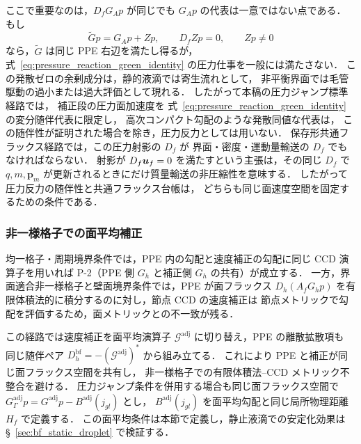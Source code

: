 ここで重要なのは，$D_fG_Ap$ が同じでも $G_Ap$ の代表は一意ではない点である．
もし
\[
  \widetilde Gp = G_Ap+Zp,\qquad D_fZp=0,\qquad Zp\ne0
\]
なら，$\widetilde G$ は同じ PPE 右辺を満たし得るが，
式~\eqref{eq:pressure_reaction_green_identity} の圧力仕事を一般には満たさない．
この発散ゼロの余剰成分は，静的液滴では寄生流れとして，
非平衡界面では毛管駆動の過小または過大評価として現れる．
したがって本稿の圧力ジャンプ標準経路では，
補正段の圧力面加速度を
式~\eqref{eq:pressure_reaction_green_identity} の変分随伴代表に限定し，
高次コンパクト勾配のような発散同値な代表は，
この随伴性が証明された場合を除き，圧力反力としては用いない．
保存形共通フラックス経路では，この圧力射影の $D_f$ が
界面・密度・運動量輸送の $D_f$ でもなければならない．
射影が $D_f\bm{u}_f=0$ を満たすという主張は，その同じ $D_f$ で
$q,m,\bm{p}_m$ が更新されるときにだけ質量輸送の非圧縮性を意味する．
したがって圧力反力の随伴性と共通フラックス台帳は，
どちらも同じ面速度空間を固定するための条件である．

\subsubsection{非一様格子での面平均補正}
\label{sec:fvm_ccd_corrector}

均一格子・周期境界条件では，PPE 内の勾配と速度補正の勾配に同じ
CCD 演算子を用いれば P-2（PPE 側 $G_h$ と補正側 $G_h$ の共有）が成立する．
一方，界面適合非一様格子と壁面境界条件では，PPE が面フラックス
$D_h(A_f G_h p)$ を有限体積法的に積分するのに対し，節点 CCD の速度補正は
節点メトリックで勾配を評価するため，面メトリックとの不一致が残る．

この経路では速度補正を面平均演算子
$\mathcal{G}^\text{adj}$ に切り替え，PPE の離散拡散項も
同じ随伴ペア $D_h^\text{bf}=-(\mathcal{G}^\text{adj})^\ast$ から組み立てる．
これにより PPE と補正が同じ面フラックス空間を共有し，
非一様格子での有限体積法--CCD メトリック不整合を避ける．
圧力ジャンプ条件を併用する場合も同じ面フラックス空間で
$G_{\Gamma}^{\mathrm{adj}}p=G^{\mathrm{adj}}p-B^{\mathrm{adj}}(j_{gl})$ とし，
$B^{\mathrm{adj}}(j_{gl})$ を面平均勾配と同じ局所物理距離 $H_f$ で定義する．
この面平均条件は本節で定義し，静止液滴での安定化効果は
§~\ref{sec:bf_static_droplet} で検証する．

\label{sec:dccd_pressure_nofilt}%
